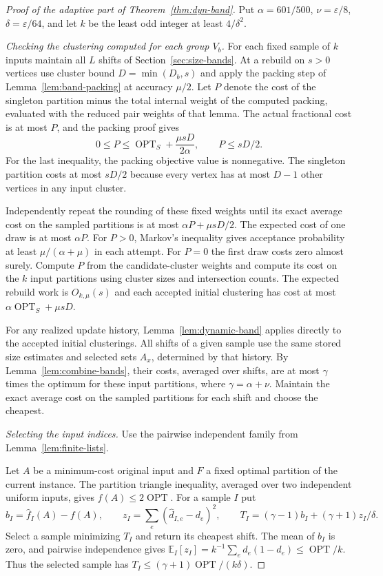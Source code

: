 \documentclass[11pt]{article}
\begin{document}
\begin{proof}[Proof of the adaptive part of Theorem~\ref{thm:dyn-band}]
Put $\alpha=601/500$, $\nu=\varepsilon/8$, $\delta=\varepsilon/64$,
and let $k$ be the least odd integer at least $4/\delta^2$.

\emph{Checking the clustering computed for each group $V_b$.}
For each fixed sample of $k$ inputs maintain all $L$ shifts of
Section~\ref{sec:size-bands}. At a rebuild on $s>0$ vertices use cluster
bound $D=\min(D_b,s)$ and apply the packing step of
Lemma~\ref{lem:band-packing} at accuracy $\mu/2$. Let $P$ denote the
cost of the singleton partition minus the total internal weight of the computed
packing, evaluated with the reduced pair weights of that lemma. The
actual fractional cost is at most $P$, and the packing proof gives
\[
 0\le P\le\operatorname{OPT}_S+\frac{\mu sD}{2\alpha},
 \qquad P\le sD/2 .
\]
For the last inequality, the packing objective value is nonnegative.
The singleton partition costs at most $sD/2$ because every vertex
has at most $D-1$ other vertices in any input cluster.

Independently repeat the rounding of these fixed weights until its
exact average cost on the sampled partitions is at most $\alpha P+\mu sD/2$. The expected cost of
one draw is at most $\alpha P$. For $P>0$, Markov's inequality gives
acceptance probability at least $\mu/(\alpha+\mu)$ in each attempt.
For $P=0$ the first draw costs zero almost surely. Compute $P$ from the
candidate-cluster weights and compute its cost on the $k$ input partitions using
cluster sizes and intersection counts. The expected rebuild work is
$O_{k,\mu}(s)$ and each accepted initial clustering has cost at most
$\alpha\operatorname{OPT}_S+\mu sD$.

For any realized update history, Lemma~\ref{lem:dynamic-band}
applies directly to the accepted initial clusterings. All shifts of a given sample
use the same stored size estimates and selected sets $A_x$, determined by that history.
By Lemma~\ref{lem:combine-bands}, their costs, averaged over shifts, are at most
$\gamma$ times the optimum for these input partitions, where $\gamma=\alpha+\nu$. Maintain
the exact average cost on the sampled partitions for each shift and choose the cheapest.

\emph{Selecting the input indices.}
Use the pairwise independent family from Lemma~\ref{lem:finite-lists}.

Let $A$ be a minimum-cost original input and $F$ a fixed optimal partition of the
current instance. The partition triangle inequality, averaged over two
independent uniform inputs, gives $f(A)\le2\operatorname{OPT}$. For
a sample $I$ put
\[
 b_I=\widehat f_I(A)-f(A),\qquad
 z_I=\sum_e(\widehat d_{I,e}-d_e)^2,\qquad
 T_I=(\gamma-1)b_I+(\gamma+1)z_I/\delta .
\]
Select a sample minimizing $T_I$ and return its cheapest shift.
The mean of $b_I$ is zero, and pairwise independence gives
$\mathbb E_I[z_I]=k^{-1}\sum_e d_e(1-d_e)\le\operatorname{OPT}/k$.
Thus the selected sample has
$T_I\le(\gamma+1)\operatorname{OPT}/(k\delta)$.


\end{proof}
\end{document}
